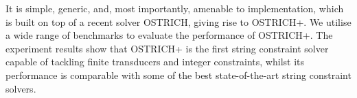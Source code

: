 It is simple, generic, and, most importantly, amenable to implementation, which 
is built on top of a recent solver OSTRICH,
giving rise to OSTRICH+.
We utilise a wide range of benchmarks to evaluate the performance of OSTRICH+. The experiment results show that OSTRICH+ is the first string constraint solver capable of tackling finite transducers and integer constraints, whilst
its performance is comparable with some of the best state-of-the-art string constraint solvers.
